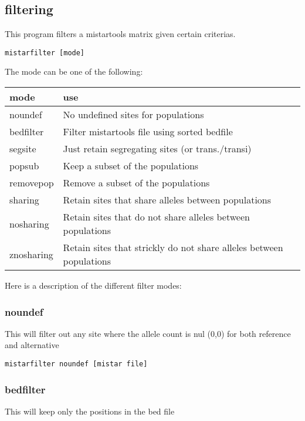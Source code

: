 \documentclass[a4paper]{article}
\begin{document}
\subsection{filtering}

This program filters a mistartools matrix given certain criterias.

\begin{verbatim}
mistarfilter [mode]
\end{verbatim}

The mode can be one of the following:

\begin{tabular}{ll}
\hline
mode & use \\
\hline
noundef      &   No undefined sites for populations \\
bedfilter    &   Filter mistartools file using sorted bedfile \\
segsite      &   Just retain segregating sites (or trans./transi) \\
popsub       &   Keep a subset of the populations \\
removepop    &   Remove a subset of the populations \\
sharing      &   Retain sites that share alleles between populations \\
nosharing    &   Retain sites that do not share alleles between populations \\
znosharing   &   Retain sites that strickly do not share alleles between populations \\
\end{tabular}

Here is a description of the different filter modes:

\subsubsection{noundef}

This will filter out any site where the allele count is nul (0,0) for both reference and alternative

\begin{verbatim}
mistarfilter noundef [mistar file]
\end{verbatim}


\subsubsection{bedfilter}

This will keep only the positions in the bed file
\end{document}
